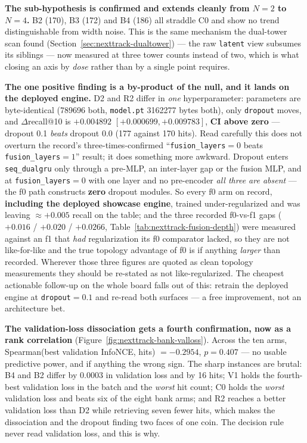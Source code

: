 \documentclass[11pt]{article}
\begin{document}
\textbf{The sub-hypothesis is confirmed and extends cleanly from $N=2$ to
$N=4$.} B2 (\num{170}), B3 (\num{172}) and B4 (\num{186}) all straddle C0 and
show no trend distinguishable from width noise. This is the same mechanism the
dual-tower scan found (Section~\ref{sec:nexttrack-dualtower}) --- the raw
\texttt{latent} view subsumes its siblings --- now measured at three tower counts
instead of two, which is what closing an axis by \emph{dose} rather than by a
single point requires.

\textbf{The one positive finding is a by-product of the null, and it lands on the
deployed engine.} D2 and R2 differ in \emph{one} hyperparameter: parameters are
byte-identical (\num{789696} both, \texttt{model.pt} \num{3162277} bytes both),
only \texttt{dropout} moves, and $\Delta$recall@10 is $+\num{0.004892}$
$[+\num{0.000699},+\num{0.009783}]$, \textbf{CI above zero} --- dropout
\num{0.1} \emph{beats} dropout \num{0.0} (\num{177} against \num{170} hits).
Read carefully this does not overturn the record's three-times-confirmed
``\texttt{fusion\_layers}${}=0$ beats
\texttt{fusion\_layers}${}=1$'' result; it does something more
awkward. Dropout enters \texttt{seq\_dualgru} only through a pre-MLP, an
inter-layer gap or the fusion MLP, and at \texttt{fusion\_layers}${}=0$ with one
layer and no pre-encoder \emph{all three are absent} --- the f0 path constructs
\textbf{zero} dropout modules. So every f0 arm on record, \textbf{including the
deployed showcase engine}, trained under-regularized and was leaving
${\approx}+\num{0.005}$ recall on the table; and the three recorded f0-vs-f1 gaps
($+\num{0.016}$ / $+\num{0.020}$ / $+\num{0.0266}$,
Table~\ref{tab:nexttrack-fusion-depth}) were measured against an f1 that
\emph{had} regularization its f0 comparator lacked, so they are not like-for-like
and the true topology advantage of f0 is if anything \emph{larger} than recorded.
Wherever those three figures are quoted as clean topology measurements they
should be re-stated as not like-regularized. The cheapest actionable follow-up on
the whole board falls out of this: retrain the deployed engine at
\texttt{dropout}${}=\num{0.1}$ and re-read both surfaces --- a free improvement,
not an architecture bet.

\textbf{The validation-loss dissociation gets a fourth confirmation, now as a
rank correlation} (Figure~\ref{fig:nexttrack-bank-valloss}). Across the ten arms,
Spearman(best validation InfoNCE, hits) $=-\num{0.2954}$, $p=\num{0.407}$ --- no
usable predictive power, and if anything the wrong sign. The sharp instances are
brutal: B4 and B2 differ by \num{0.0003} in validation loss and by \num{16}
hits; V1 holds the fourth-best validation loss in the batch and the \emph{worst}
hit count; C0 holds the \emph{worst} validation loss and beats six of the eight
bank arms; and R2 reaches a better validation loss than D2 while retrieving seven
fewer hits, which makes the dissociation and the dropout finding two faces of one
coin. The decision rule never read validation loss, and this is why.
\end{document}
